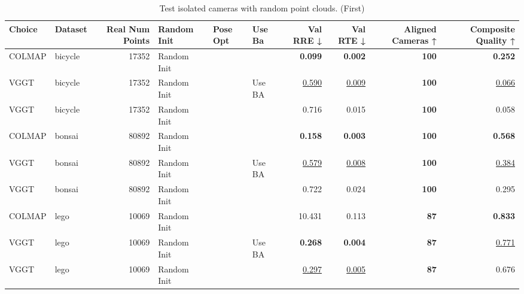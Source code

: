 \begin{table}[H]
\caption{Test isolated cameras with random point clouds. (First)}
\label{tab:06_isolated_cams_first}
\small
\begin{tabular}{llrlllrrrr}
\toprule
Choice & Dataset & Real Num Points & Random Init & Pose Opt & Use Ba & Val RRE ↓ & Val RTE ↓ & Aligned Cameras ↑ & Composite Quality ↑ \\
\midrule
COLMAP & bicycle & 17352 & Random Init &  &  & \textbf{0.099} & \textbf{0.002} & \textbf{100} & \textbf{0.252} \\
VGGT & bicycle & 17352 & Random Init &  & Use BA & \underline{0.590} & \underline{0.009} & \textbf{100} & \underline{0.066} \\
VGGT & bicycle & 17352 & Random Init &  &  & 0.716 & 0.015 & \textbf{100} & 0.058 \\
\midrule
COLMAP & bonsai & 80892 & Random Init &  &  & \textbf{0.158} & \textbf{0.003} & \textbf{100} & \textbf{0.568} \\
VGGT & bonsai & 80892 & Random Init &  & Use BA & \underline{0.579} & \underline{0.008} & \textbf{100} & \underline{0.384} \\
VGGT & bonsai & 80892 & Random Init &  &  & 0.722 & 0.024 & \textbf{100} & 0.295 \\
\midrule
COLMAP & lego & 10069 & Random Init &  &  & 10.431 & 0.113 & \textbf{87} & \textbf{0.833} \\
VGGT & lego & 10069 & Random Init &  & Use BA & \textbf{0.268} & \textbf{0.004} & \textbf{87} & \underline{0.771} \\
VGGT & lego & 10069 & Random Init &  &  & \underline{0.297} & \underline{0.005} & \textbf{87} & 0.676 \\
\bottomrule
\end{tabular}
\end{table}